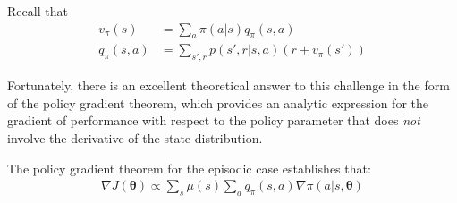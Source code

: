 {\begin{tcolorbox}[colbacktitle=black!7!white,coltitle=black!75!white,title=\textbf{Proof of the Policy Gradient Theorem (episodic case)}]
Recall that
\begin{align*}
    v_\pi(s)&=\sum_a \pi(a|s)q_\pi(s,a)\\
    q_\pi(s, a)&=\sum_{s', r} p(s', r|s,a)(r+v_\pi(s'))
\end{align*}
\end{tcolorbox}
Fortunately, there is an excellent theoretical answer to this challenge in the form of the policy gradient theorem, which provides an analytic expression for the gradient of performance with respect to the policy parameter that does \textit{not} involve the derivative of the state distribution.

The policy gradient theorem for the episodic case establishes that:
\begin{align}
    \nabla J(\bm{\theta})\propto\sum_{s}\mu(s)\sum_a q_\pi(s,a)\nabla\pi(a|s, \bm{\theta})
\end{align}

}
